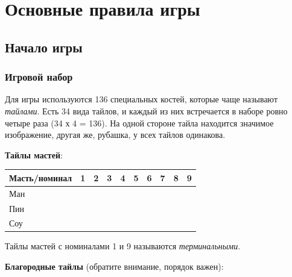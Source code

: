 \section{Основные правила игры}

\subsection{Начало игры}

\subsubsection{Игровой набор}

Для игры используются 136 специальных костей, которые чаще называют \textit{тайлами}. Есть 34 вида тайлов, и каждый из них встречается в наборе ровно четыре раза (34 х 4 = 136). На одной стороне тайла находится значимое изображение, другая же, рубашка, у всех тайлов одинакова.

\textbf{Тайлы мастей}:

\noindent\begin{tabular}{ C{3.5cm}ccccccccc } 
	\toprule
	Масть/номинал & 1 & 2 & 3 & 4 & 5 & 6 & 7 & 8 & 9 \\
	\midrule
	Ман \newline &  &  &  &  &  &  &  &  &  \rule[1ex]{0pt}{7ex} \\
	\midrule
	Пин \newline &  &  &  &  &  &  &  &  &  \rule[1ex]{0pt}{7ex} \\
	\midrule
	Соу \newline &  &  &  &  &  &  &  &  &  \rule[1ex]{0pt}{7ex} \\
	\bottomrule 
\end{tabular}

Тайлы мастей с номиналами 1 и 9 называются \textit{терминальными}.
\vspace{1cm}

\textbf{Благородные тайлы} (обратите внимание, порядок важен):


